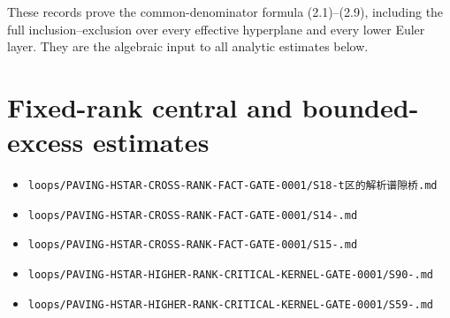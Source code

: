 \documentclass[10pt]{article}
\begin{document}
These records prove the common-denominator formula (2.1)--(2.9), including the
full inclusion--exclusion over every effective hyperplane and every lower Euler
layer.  They are the algebraic input to all analytic estimates below.

\section{Fixed-rank central and bounded-excess estimates}


\begin{itemize}
\item \texttt{loops/\allowbreak{}PAVING-\allowbreak{}HSTAR-\allowbreak{}CROSS-\allowbreak{}RANK-\allowbreak{}FACT-\allowbreak{}GATE-\allowbreak{}0001/\allowbreak{}S18-t{\cjkfont 区\allowbreak{}的\allowbreak{}解\allowbreak{}析\allowbreak{}谱\allowbreak{}隙\allowbreak{}桥}.\allowbreak{}md}
\item \texttt{loops/\allowbreak{}PAVING-\allowbreak{}HSTAR-\allowbreak{}CROSS-\allowbreak{}RANK-\allowbreak{}FACT-\allowbreak{}GATE-\allowbreak{}0001/\allowbreak{}S14-.\allowbreak{}md}
\item \texttt{loops/\allowbreak{}PAVING-\allowbreak{}HSTAR-\allowbreak{}CROSS-\allowbreak{}RANK-\allowbreak{}FACT-\allowbreak{}GATE-\allowbreak{}0001/\allowbreak{}S15-.\allowbreak{}md}
\item \texttt{loops/\allowbreak{}PAVING-\allowbreak{}HSTAR-\allowbreak{}HIGHER-\allowbreak{}RANK-\allowbreak{}CRITICAL-\allowbreak{}KERNEL-\allowbreak{}GATE-\allowbreak{}0001/\allowbreak{}S90-.\allowbreak{}md}
\item \texttt{loops/\allowbreak{}PAVING-\allowbreak{}HSTAR-\allowbreak{}HIGHER-\allowbreak{}RANK-\allowbreak{}CRITICAL-\allowbreak{}KERNEL-\allowbreak{}GATE-\allowbreak{}0001/\allowbreak{}S59-.\allowbreak{}md}

\end{itemize}
\end{document}
